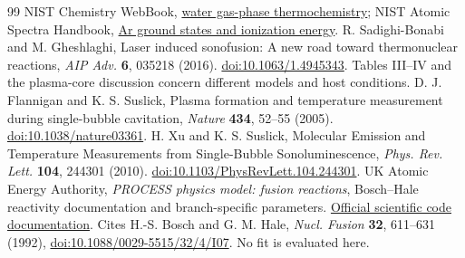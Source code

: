 \begin{thebibliography}{99}
 NIST Chemistry WebBook, \href{https://webbook.nist.gov/cgi/cbook.cgi?ID=C7732185\&Units=SI\&Mask=1}{water gas-phase thermochemistry}; NIST Atomic Spectra Handbook, \href{https://physics.nist.gov/PhysRefData/Handbook/Tables/argontable1.htm}{Ar ground states and ionization energy}.
 R. Sadighi-Bonabi and M. Gheshlaghi, Laser induced sonofusion: A new road toward thermonuclear reactions, \emph{AIP Adv.} \textbf{6}, 035218 (2016). \href{https://doi.org/10.1063/1.4945343}{doi:10.1063/1.4945343}. Tables III--IV and the plasma-core discussion concern different models and host conditions.
 D. J. Flannigan and K. S. Suslick, Plasma formation and temperature measurement during single-bubble cavitation, \emph{Nature} \textbf{434}, 52--55 (2005). \href{https://doi.org/10.1038/nature03361}{doi:10.1038/nature03361}.
 H. Xu and K. S. Suslick, Molecular Emission and Temperature Measurements from Single-Bubble Sonoluminescence, \emph{Phys. Rev. Lett.} \textbf{104}, 244301 (2010). \href{https://doi.org/10.1103/PhysRevLett.104.244301}{doi:10.1103/PhysRevLett.104.244301}.
 UK Atomic Energy Authority, \emph{PROCESS physics model: fusion reactions}, Bosch--Hale reactivity documentation and branch-specific parameters. \href{https://ukaea.github.io/PROCESS/source/reference/process/models/physics/fusion_reactions/}{Official scientific code documentation}. Cites H.-S. Bosch and G. M. Hale, \emph{Nucl. Fusion} \textbf{32}, 611--631 (1992), \href{https://doi.org/10.1088/0029-5515/32/4/I07}{doi:10.1088/0029-5515/32/4/I07}. No fit is evaluated here.
\end{thebibliography}
